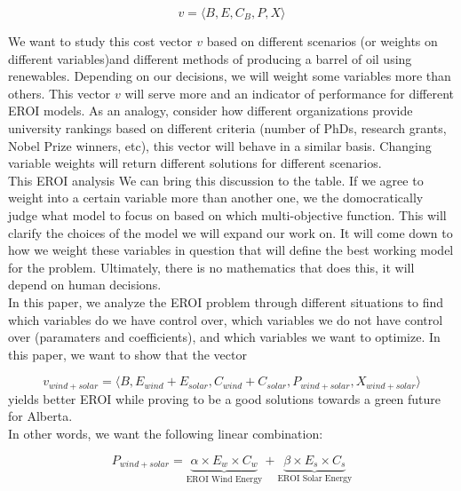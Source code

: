 \documentclass[12pt]{article}
\begin{document}
\begin{displaymath}
v = \langle B, E, C_B, P, X \rangle
\end{displaymath}

We want to study this cost vector $v$ based on different scenarios (or weights on different variables)and different methods of producing a barrel of oil using renewables. Depending on our decisions, we will weight some variables more than others. This vector $v$ will serve more and an indicator of performance for different EROI models. As an analogy, consider how different organizations provide university rankings based on different criteria (number of PhDs, research grants, Nobel Prize winners, etc), this vector will behave in a similar basis.  Changing variable weights will return different solutions for different scenarios. \\

This EROI analysis We can bring this discussion to the table. If we agree to weight into a certain variable more than another one, we the domocratically judge what model to focus on based on which multi-objective function. This will clarify the choices of the model we will expand our work on. It will come down to how we weight these variables in question that will define the best working model for the problem. Ultimately, there is no mathematics that does this, it will depend on human decisions. \\

In this paper, we analyze the EROI problem through different situations to find which variables do we have control over, which variables we do not have control over (paramaters and coefficients), and which variables we want to optimize. In this paper, we want to show that the vector 

\begin{displaymath}
v_{wind+solar}= \langle B, E_{wind} + E_{solar}, C_{wind} + C_{solar}, P_{wind + solar}, X_{wind+solar}\rangle
\end{displaymath}
 yields better EROI while proving to be a good solutions towards a green future for Alberta. \\

In other words, we want the following linear combination:

\begin{displaymath}
P_{wind+solar} = \underbrace{\alpha \times E_w \times C_w}_\text{EROI Wind Energy} + \underbrace{ \beta \times E_s \times C_s}_\text{EROI Solar Energy}
\end{displaymath}
\end{document}
